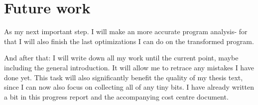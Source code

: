 \documentclass{article}
\begin{document}
  \section{Future work}
    As my next important step. I will make an more accurate program analysis- for that I will
    also finish the last optimizations I can do on the transformed program.
    
    And after that:
    I will write down all my work until the current point, maybe including the general introduction.
    It will allow me to retrace any mistakes I have done yet. This task will also significantly benefit the quality of my thesis text,
    since I can now also focus on collecting all of any tiny bits.
    I have already written a bit in this progress report and the accompanying cost centre document.
    
\end{document}
